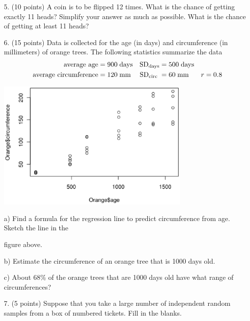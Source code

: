 \documentclass[10pt]{article}
\newcommand{\HH}{\hspace{10pt}\hphantom{a) } }
\begin{document}
5. (10 points) A coin is to be flipped 12 times. What is the chance of 
getting exactly 11 heads?  Simplify your answer as much as possible.
What is the chance of getting at least 11 heads?
\vfill
\eject
{\ }

6. (15 points) Data is collected for the age (in days) and circumference (in millimeters) 
of orange trees.
The following statistics summarize the data
\begin{align*}
\mbox{average age}&= 900\;\mbox{days} & \mbox{SD}_{\scriptsize\mbox{days}} &= 500\;\mbox{days}\\
\mbox{average circumference} &= 120\;\mbox{mm} & \mbox{SD}_{\scriptsize\mbox{circ}}\; &= 60\;\mbox{mm}
   & r=0.8
\end{align*}

\begin{center}
\includegraphics[height=2.5in,bb= 0 0 515 335, clip]{Oranges.eps}
\end{center}

\hspace{10pt} a) Find a formula for the regression line to predict circumference 
from age.  Sketch the line in the\vspace{-4pt}

\HH  figure above.
\vspace{1.5in}

\hspace{10pt} b) Estimate the circumference of an orange tree that is
1000 days old.
\vspace{2in}

\hspace{10pt} c) About 68\% of the orange trees that are 1000 days old 
have what range of circumferences?
\vfill
\eject
{\ }

7. (5 points)
Suppose that you take a large number of independent random samples from a box of numbered
tickets.
Fill in the blanks.
\end{document}

